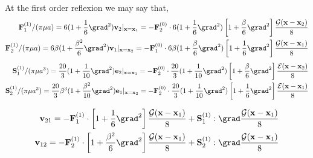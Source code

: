 At the first order reflexion we may say that, 
\begin{align}
    \textbf{F}^{(1)}_1/(\pi\mu a) 
    = 6 (1 + \frac{1}{6}\grad^2) \textbf{v}_2|_{\textbf{x}=\textbf{x}_1}
    = - \textbf{F}_2^{(0)}\cdot 6 (1 + \frac{1}{6}\grad^2) \left[1+\frac{\beta}{6}\grad^2 \right]\frac{\mathcal{G}(\textbf{x}-\textbf{x}_2)}{8}\\
    \textbf{F}^{(1)}_2/(\pi\mu a) 
    = 6 \beta (1 + \frac{\beta^2}{6}\grad^2) \textbf{v}_1|_{\textbf{x}=\textbf{x}_2}
    = - \textbf{F}_1^{(0)}\cdot 6\beta (1 + \frac{\beta}{6}\grad^2) \left[1+\frac{1}{6}\grad^2 \right]\frac{\mathcal{G}(\textbf{x}-\textbf{x}_1)}{8}
\end{align}
\begin{align}
    \textbf{S}^{(1)}_1/(\pi\mu a^3) 
    = \frac{20}{3} (1 + \frac{1}{10}\grad^2) \textbf{e}_2|_{\textbf{x}=\textbf{x}_1}
    = - \textbf{F}_2^{(0)}\cdot\frac{20}{3} (1 + \frac{1}{10}\grad^2) \left[1+\frac{\beta}{6}\grad^2 \right]\frac{\mathcal{E}(\textbf{x}-\textbf{x}_2)}{8}\\
    \textbf{S}^{(1)}_2/(\pi\mu a^3) 
    = \frac{20}{3} \beta^3 (1 + \frac{\beta^2}{10}\grad^2) \textbf{e}_1|_{\textbf{x}=\textbf{x}_2}
    = - \textbf{F}_2^{(0)}\cdot\frac{20}{3} (1 + \frac{1}{10}\grad^2) \left[1+\frac{1}{6}\grad^2 \right]\frac{\mathcal{E}(\textbf{x}-\textbf{x}_1)}{8}
\end{align}


\begin{align*}
    \textbf{v}_{21}
    = - \textbf{F}_1^{(1)}\cdot \left[1+\frac{1}{6}\grad^2 \right]\frac{\mathcal{G}(\textbf{x}-\textbf{x}_1)}{8}
    + \textbf{S}_1^{(1)} :\grad  \frac{\mathcal{G}(\textbf{x}-\textbf{x}_1)}{8}\\
    \textbf{v}_{12}
    = - \textbf{F}_2^{(1)}\cdot \left[1+\frac{\beta^2}{6}\grad^2 \right]\frac{\mathcal{G}(\textbf{x}-\textbf{x}_1)}{8}
    + \textbf{S}_2^{(1)} :\grad  \frac{\mathcal{G}(\textbf{x}-\textbf{x}_1)}{8}\\
\end{align*}

